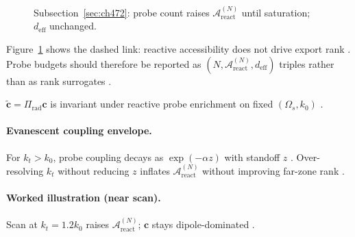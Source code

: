 \begin{figure}[t]
\centering
{}
\caption{Subsection~\ref{sec:ch472}: probe count raises \(\mathcal{A}_{\mathrm{react}}^{(N)}\) until saturation; \(d_{\mathrm{eff}}\) unchanged.}
\label{fig:ch4.probe-saturation-map}
\end{figure}

Figure~\ref{fig:ch4.probe-saturation-map} shows the dashed link: reactive accessibility does not drive export rank \cite{harrington2001,stratton1941,devaney2004}.
Probe budgets should therefore be reported as \((N,\mathcal{A}_{\mathrm{react}}^{(N)},d_{\mathrm{eff}})\) triples rather than as rank surrogates
\cite{hansen1988,devaney2004}.

\begin{corollary}
\label{cor:ch4.prop-filter-persist}
\(\widetilde{\mathbf{c}}=\Pi_{\mathrm{rad}}\mathbf{c}\) is invariant under reactive probe enrichment on fixed \((\Omega_{s},k_{0})\)
\cite{stratton1941,harrington2001,devaney2004,hansen1988}.
\end{corollary}

\paragraph{Evanescent coupling envelope.}
For \(k_{t}>k_{0}\), probe coupling decays as \(\exp(-\alpha z)\) with standoff \(z\) \cite{jackson1999,hansen1988}. Over-resolving \(k_{t}\) without
reducing \(z\) inflates \(\mathcal{A}_{\mathrm{react}}^{(N)}\) without improving far-zone rank \cite{harrington2001,devaney2004}.

\paragraph{Worked illustration (near scan).}
Scan at \(k_{t}=1.2k_{0}\) raises \(\mathcal{A}_{\mathrm{react}}^{(N)}\); \(\mathbf{c}\) stays dipole-dominated \cite{harrington2001,jackson1999,hansen1988}.

